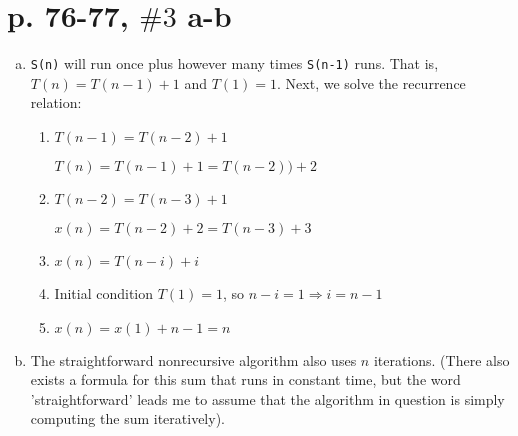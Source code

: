 \documentclass[a4paper,10pt]{article}
\begin{document}
\section*{p. 76-77, $\#3$ a-b}
\begin{enumerate}[(a)]
\item \verb|S(n)| will run once plus however many times \verb|S(n-1)| runs. That is, $T(n) = T(n-1) + 1$ and $T(1) = 1$. Next, we solve the recurrence relation:

	\begin{enumerate}[Step 1.]
		\item $T(n-1) = T(n-2) + 1$
	
		$T(n) = T(n-1) + 1 = T(n-2)) + 2$
		\item $T(n-2) = T(n-3) + 1$
	
		$x(n) = T(n-2) + 2  = T(n-3) + 3$
		\item $x(n) = T(n-i) + i$
	
		\item Initial condition $T(1) = 1$, so $n - i = 1 \Rightarrow i = n-1$
	
		\item $x(n) = x(1) + n-1 = \boxed{n}$
	\end{enumerate}
\item The straightforward nonrecursive algorithm also uses $n$ iterations. (There also exists a formula for this sum that runs in constant time, but the word 'straightforward' leads me to assume that the algorithm in question is simply computing the sum iteratively).
\end{enumerate}
\end{document}
